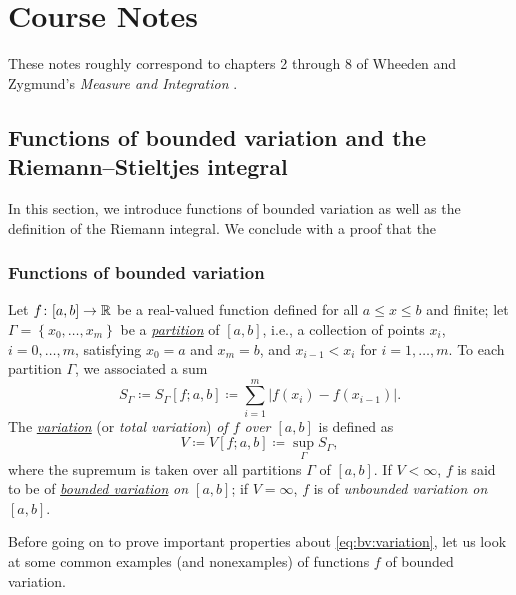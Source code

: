 \chapter{Course Notes}
These notes roughly correspond to chapters 2 through 8 of Wheeden and
Zygmund's \emph{Measure and Integration}
\cite{wheeden-zygmund:measure-and-integral}.

\section{Functions of bounded variation and the Riemann--Stieltjes
  integral}
In this section, we introduce functions of bounded variation as well as the
definition of the Riemann integral. We conclude with a proof that the

\subsection{Functions of bounded variation}
Let $f\colon[a,b]\to\mathbb{R}$ be a real-valued function defined for all $a\leq
x\leq b$ and finite; let $\Gamma=\left\{x_0,\dotsc,x_m\right\}$ be a
\href{https://en.wikipedia.org/wiki/Partition_of_an_interval}{\emph{partition}}
of $[a,b]$, i.e., a collection of points $x_i$, $i=0,\dotsc,m$, satisfying
$x_0=a$ and $x_m=b$, and $x_{i-1}<x_i$ for $i=1,\dotsc,m$. To each
partition $\Gamma$, we associated a sum
\begin{equation}
\label{eq:bv:sum}
S_\Gamma\coloneqq S_\Gamma[f;a,b]\coloneqq\sum_{i=1}^m\left|f(x_i)-f(x_{i-1})\right|.
\end{equation}
The
\href{https://en.wikipedia.org/wiki/Bounded_variation#Formal_definition}{\emph{variation}}
(or \emph{total variation}) \emph{of $f$ over $[a,b]$} is defined as
\begin{equation}
  \label{eq:bv:variation}
V\coloneqq V[f;a,b]\coloneqq\sup_\Gamma S_\Gamma,
\end{equation}
where the supremum is taken over all partitions $\Gamma$ of $[a,b]$. If
$V<\infty$, $f$ is said to be of
\href{https://en.wikipedia.org/wiki/Bounded_variation}{\emph{bounded
    variation}} \emph{on $[a,b]$}; if $V=\infty$, $f$ is of \emph{unbounded
variation on $[a,b]$}.

Before going on to prove important properties about
\eqref{eq:bv:variation}, let us look at some common examples (and
nonexamples) of functions $f$ of bounded variation.

